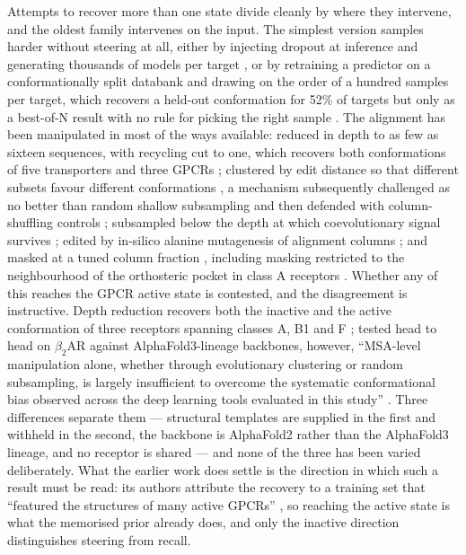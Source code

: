 Attempts to recover more than one state divide cleanly by where they intervene, and the oldest
family intervenes on the input. The simplest version samples harder without steering at all, either
by injecting dropout at inference and generating thousands of models per target
\citep{wallner2023afsample}, or by retraining a predictor on a conformationally split databank and
drawing on the order of a hundred samples per target, which recovers a held-out conformation for
52\% of targets but only as a best-of-N result with no rule for picking the right sample
\citep{bryant2024cfold}. The alignment has been manipulated in most of the ways available: reduced in
depth to as few as sixteen sequences, with recycling cut to one, which recovers both conformations of
five transporters and three GPCRs \citep{delalamo2022sampling}; clustered by
edit distance so that different subsets favour different conformations \citep{waymentsteele2024cluster},
a mechanism subsequently challenged as no better than random shallow subsampling
\citep{schafer2025confounds} and then defended with column-shuffling controls \citep{waymentsteele2025reply};
subsampled below the depth at which coevolutionary signal survives \citep{lee2025seqassoc}; edited by
in-silico alanine mutagenesis of alignment columns \citep{stein2022speachaf}; and masked at a tuned
column fraction \citep{kalakoti2025afsample2,kalakoti2026afsample3}, including masking restricted to the
neighbourhood of the orthosteric pocket in class A receptors \citep{mitjavila2026afsample2t}. Whether any of this reaches
the GPCR active state is contested, and the disagreement is instructive. Depth reduction recovers
both the inactive and the active conformation of three receptors spanning classes A, B1 and F
\citep{delalamo2022sampling}; tested head to head on $\beta_2$AR against AlphaFold3-lineage
backbones, however, ``MSA-level manipulation alone, whether through evolutionary clustering or
random subsampling, is largely insufficient to overcome the systematic conformational bias observed
across the deep learning tools evaluated in this study'' \citep[pp.~16--17]{ye2026multistatebias}.
Three differences separate them --- structural templates are supplied in the first and withheld in
the second, the backbone is AlphaFold2 rather than the AlphaFold3 lineage, and no receptor is shared
--- and none of the three has been varied deliberately. What the earlier work does settle is the
direction in which such a result must be read: its authors attribute the recovery to a training set
that ``featured the structures of many active GPCRs'' \citep{delalamo2022sampling}, so reaching the
active state is what the memorised prior already does, and only the inactive direction distinguishes
steering from recall.

